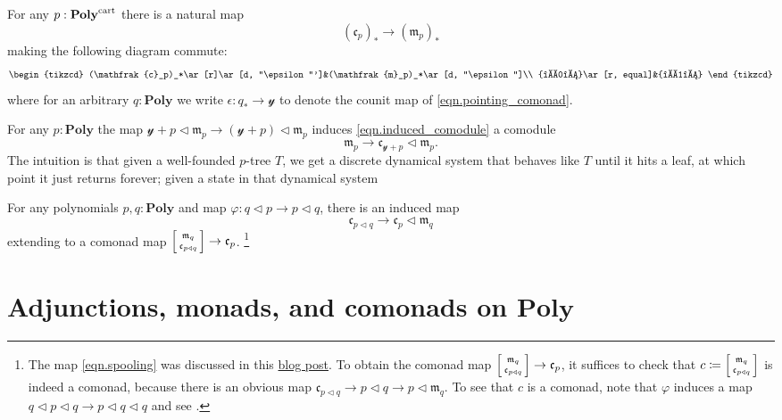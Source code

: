 \documentclass[11pt, one side, article]{memoir}
\makeatletter
\theoremstyle{definition}
\theoremstyle{plain}
\newcommand{\Cat}[1]{\mathbf{#1}}%
\newcommand{\tn}[1]{\textnormal{#1}}
\newcommand{\yon}{{\mathcal{y}}}
\newcommand{\poly}{\Cat{Poly}}
\newcommand{\cart}{\tn{cart}}
\newcommand{\polycart}{\poly^\cart}
\newcommand{\0}{\textsf{0}}
\newcommand{\1}{\tn{\textsf{1}}}
\newcommand{\tri}{\mathbin{\triangleleft}}
\newcommand{\at}[2]{#1/#2}
\newcommand{\cofree}{\mathfrak{c}}
\newcommand{\free}{\mathfrak{m}}
\newcommand{\biglens}[2]{
     \begin{bmatrix}{\vphantom{f_f^f}#2} \\ {\vphantom{f_f^f}#1} \end{bmatrix}
}
\newcommand{\littlelens}[2]{
     \begin{bsmallmatrix}{\vphantom{f}#2} \\ {\vphantom{f}#1} \end{bsmallmatrix}
}
\newcommand{\lens}[2]{
  \relax\if@display
     \biglens{#1}{#2}
  \else
     \littlelens{#1}{#2}
  \fi
}
\makeatother
\begin{document}
For any $p:\polycart$ there is a natural map
\begin{equation}
	(\cofree_p)_*\to(\free_p)_*
\end{equation}
making the following diagram commute:
\begin{equation}
\begin{tikzcd}
	(\cofree_p)_*\ar[r]\ar[d, "\epsilon"']&(\free_p)_*\ar[d, "\epsilon"]\\
	\yon\ar[r, equal]&\yon
\end{tikzcd}
\end{equation}
where for an arbitrary $q:\poly$ we write $\epsilon\colon q_*\to\yon$ to denote the counit map of \cref{eqn.pointing_comonad}.


For any $p:\poly$ the map $\yon+p\tri\free_p\to(\yon+p)\tri\free_p$ induces \eqref{eqn.induced_comodule} a comodule
\begin{equation}
\free_p\to\cofree_{\yon+p}\tri\free_p.
\end{equation}
The intuition is that given a well-founded $p$-tree $T$, we get a discrete dynamical system that behaves like $T$ until it hits a leaf, at which point it just returns forever; given a state in that dynamical system


For any polynomials $p,q:\poly$ and map $\varphi\colon q\tri p\to p\tri q$, there is an induced map
\begin{equation}\label{eqn.spooling}
	\cofree_{p\tri q}\to\cofree_p\tri\free_q
\end{equation}
extending to a comonad map $\lens{\cofree_{p\tri q}}{\free_q}\to\cofree_p$.%
\footnote{The map \eqref{eqn.spooling} was discussed in this \href{https://topos.institute/blog/2023-04-24-spooling-syntax-from-behavior/}{blog post}. To obtain the comonad map $\lens{\cofree_{p\tri q}}{\free_q}\to\cofree_p$, it suffices to check that $c\coloneqq\lens{\cofree_{p\tri q}}{\free_q}$ is indeed a comonad, because there is an obvious map $\cofree_{p\tri q}\to p\tri q\to p\tri\free_q$. To see that $c$ is a comonad, note that $\varphi$ induces a map $q\tri p\tri q\to p\tri q\tri q$ and see \cite[Example 5.11]{spivak2025categories}.}

\chapter{Adjunctions, monads, and comonads on $\poly$}\label{chap.adj_mon_com}
\end{document}
